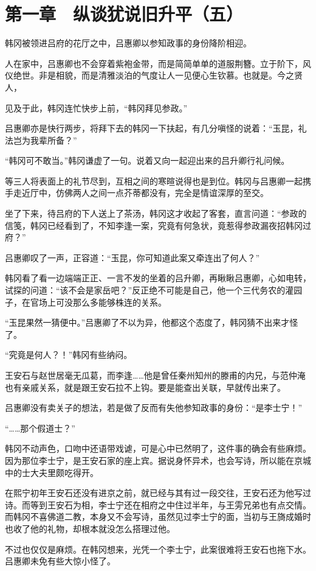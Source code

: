 \section{第一章　纵谈犹说旧升平（五）}

韩冈被领进吕府的花厅之中，吕惠卿以参知政事的身份降阶相迎。

人在家中，吕惠卿也不会穿着紫袍金带，而是简简单单的道服荆簪。立于阶下，风仪绝世。非是相貌，而是清雅淡泊的气度让人一见便心生钦慕。也就是。今之贤人，

见及于此，韩冈连忙快步上前，“韩冈拜见参政。”

吕惠卿亦是快行两步，将拜下去的韩冈一下扶起，有几分嗔怪的说着：“玉昆，礼法岂为我辈所备？”

“韩冈可不敢当。”韩冈谦虚了一句。说着又向一起迎出来的吕升卿行礼问候。

等三人将表面上的礼节尽到，互相之间的寒暄说得也是到位。韩冈与吕惠卿一起携手走近厅中，仿佛两人之间一点芥蒂都没有，完全是情谊深厚的至交。

坐了下来，待吕府的下人送上了茶汤，韩冈这才收起了客套，直言问道：“参政的信笺，韩冈已经看到了，不知李逢一案，究竟有何急状，竟惹得参政漏夜招韩冈过府？”

吕惠卿叹了一声，正容道：“玉昆，你可知道此案又牵连出了何人？”

韩冈看了看一边端端正正、一言不发的坐着的吕升卿，再瞅瞅吕惠卿，心如电转，试探的问道：“该不会是家岳吧？”反正绝不可能是自己，他一个三代务农的灌园子，在官场上可没那么多能够株连的关系。

“玉昆果然一猜便中。”吕惠卿了不以为异，他都这个态度了，韩冈猜不出来才怪了。

“究竟是何人？！”韩冈有些纳闷。

王安石与赵世居毫无瓜葛，而李逢……他是曾任秦州知州的滕甫的内兄，与范仲淹也有亲戚关系，就是跟王安石拉不上钩。要是能查出关联，早就传出来了。

吕惠卿没有卖关子的想法，若是做了反而有失他参知政事的身份：“是李士宁！”

“……那个假道士？”

韩冈不动声色，口吻中还语带戏谑，可是心中已然明了，这件事的确会有些麻烦。因为那位李士宁，是王安石家的座上宾。据说身怀异术，也会写诗，所以能在京城中的士大夫里颇吃得开。

在熙宁初年王安石还没有进京之前，就已经与其有过一段交往，王安石还为他写过诗。而等到王安石为相，李士宁还在相府之中住过半年，与王雱兄弟也有点交情。而韩冈不喜佛道二教，本身又不会写诗，虽然见过李士宁的面，当初与王旖成婚时也收了他的礼物，却根本就没怎么搭理过他。

不过也仅仅是麻烦。在韩冈想来，光凭一个李士宁，此案很难将王安石也拖下水。吕惠卿未免有些大惊小怪了。

